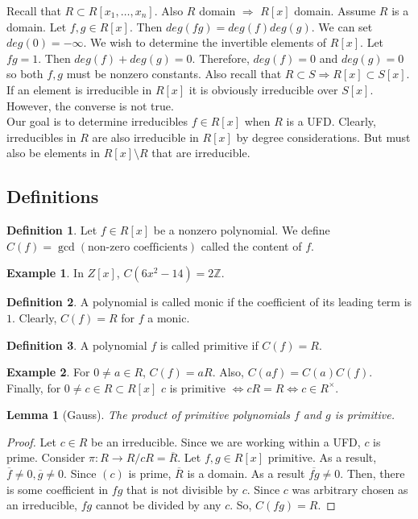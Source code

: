 \documentclass{article}
\newcommand\Z{\ensuremath{\mathbb{Z}}}
\newtheorem{lemma}[theorem]{Lemma}
\theoremstyle{definition}
\newtheorem{definition}{Definition}[subsection]
\newtheorem{eg}{Example}[subsection]
\theoremstyle{remark}
\theoremstyle{plain}
\begin{document}
Recall that \(R\subset R[x_1, \ldots, x_n]\). Also \(R\) domain \(\Rightarrow\) \(R[x]\) domain.
Assume \(R\) is a domain. Let \(f,g \in R[x]\). Then \(deg(fg) = deg(f)deg(g)\). We can set \(deg(0) = -\infty\).
We wish to determine the invertible elements of \(R[x]\). Let \(fg = 1\). Then \(deg(f) + deg(g) = 0\). Therefore, \(deg(f) = 0\) and \(deg(g) = 0\) so both \(f,g\)
must be nonzero constants. Also recall that \(R\subset S \Rightarrow R[x]\subset S[x]\). If an element is irreducible in \(R[x]\) it is obviously irreducible over \(S[x]\). 
However, the converse is not true. \\

Our goal is to determine irreducibles \(f \in R[x]\) when \(R\) is a UFD. Clearly, irreducibles in \(R\) are also irreducible in \(R[x]\) by degree considerations. 
But must also be elements in \(R[x]\setminus R\) that are irreducible.

\subsection{Definitions}

\begin{definition}
    Let \(f\in R[x]\) be a nonzero polynomial. We define \(C(f) = \gcd(\text{non-zero coefficients})\) called the content of \(f\).
\end{definition}

\begin{eg}
    In \(Z[x]\), \(C(6x^2 - 14) = 2\Z\).
\end{eg}

\begin{definition}
    A polynomial is called monic if the coefficient of its leading term is \(1\). Clearly, \(C(f) = R\) for \(f\) a monic. 
\end{definition}

\begin{definition}
    A polynomial \(f\) is called primitive if \(C(f) = R\).
\end{definition}

\begin{eg}
    For \(0 \neq a \in R\), \(C(f) = aR\). Also, \(C(af) = C(a)C(f)\). Finally,
    for \(0 \neq c \in R \subset R[x]\) \(c\) is primitive \(\iff cR =R \iff c \in R^{\times}\).
\end{eg}

\begin{lemma}[Gauss]
    The product of primitive polynomials \(f\) and \(g\) is primitive.
\end{lemma}
\begin{proof}
    Let \(c \in R\) be an irreducible. Since we are working within a UFD, \(c\) is prime. 
    Consider \(\pi: R \to R/cR = \overline{R}\). Let \(f,g \in R[x]\) primitive. As a result,
    \(\overline{f} \neq 0, \overline{g}\neq 0\). Since \((c)\) is prime, \(\overline{R}\) is a domain. 
    As a result \(\overline{fg}\neq 0\). Then, there is some coefficient in \(fg\) that is not divisible
    by \(c\). Since \(c\) was arbitrary chosen as an irreducible, \(fg\) cannot be divided by any \(c\).
    So, \(C(fg) = R\).
\end{proof}
\end{document}
